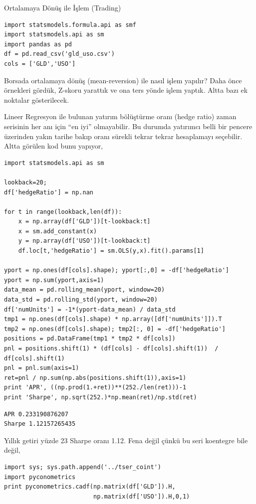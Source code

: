 \documentclass[12pt,fleqn]{article}\usepackage{../../common}
\begin{document}
Ortalamaya Dönüş ile İşlem (Trading)

\begin{verbatim}
import statsmodels.formula.api as smf
import statsmodels.api as sm
import pandas as pd
df = pd.read_csv('gld_uso.csv')
cols = ['GLD','USO']
\end{verbatim}

Borsada ortalamaya dönüş (mean-reversion) ile nasıl işlem yapılır?  Daha
önce örnekleri gördük, Z-skoru yarattık ve ona ters yönde işlem
yaptık. Altta bazı ek noktalar gösterilecek.

Lineer Regresyon ile bulunan yatırım bölüştürme oranı (hedge ratio) zaman
serisinin her anı için ``en iyi'' olmayabilir. Bu durumda yatırımcı belli
bir pencere üzerinden yakın tarihe bakıp oranı sürekli tekrar tekrar
hesaplamayı seçebilir. Altta görülen kod bunu yapıyor,

\begin{verbatim}
import statsmodels.api as sm

lookback=20;
df['hedgeRatio'] = np.nan

for t in range(lookback,len(df)):
    x = np.array(df['GLD'])[t-lookback:t]
    x = sm.add_constant(x)
    y = np.array(df['USO'])[t-lookback:t]
    df.loc[t,'hedgeRatio'] = sm.OLS(y,x).fit().params[1]

yport = np.ones(df[cols].shape); yport[:,0] = -df['hedgeRatio']
yport = np.sum(yport,axis=1)
data_mean = pd.rolling_mean(yport, window=20)
data_std = pd.rolling_std(yport, window=20)
df['numUnits'] = -1*(yport-data_mean) / data_std
tmp1 = np.ones(df[cols].shape) * np.array([df['numUnits']]).T
tmp2 = np.ones(df[cols].shape); tmp2[:, 0] = -df['hedgeRatio']
positions = pd.DataFrame(tmp1 * tmp2 * df[cols])
pnl = positions.shift(1) * (df[cols] - df[cols].shift(1))  / df[cols].shift(1)
pnl = pnl.sum(axis=1)
ret=pnl / np.sum(np.abs(positions.shift(1)),axis=1)
print 'APR', ((np.prod(1.+ret))**(252./len(ret)))-1
print 'Sharpe', np.sqrt(252.)*np.mean(ret)/np.std(ret)
\end{verbatim}

\begin{verbatim}
APR 0.233190876207
Sharpe 1.12157265435
\end{verbatim}

Yıllık getiri yüzde 23 Sharpe oranı 1.12. Fena değil çünkü bu seri
koentegre bile değil,

\begin{verbatim}
import sys; sys.path.append('../tser_coint')
import pyconometrics
print pyconometrics.cadf(np.matrix(df['GLD']).H,
                         np.matrix(df['USO']).H,0,1)

\end{verbatim}
\end{document}
